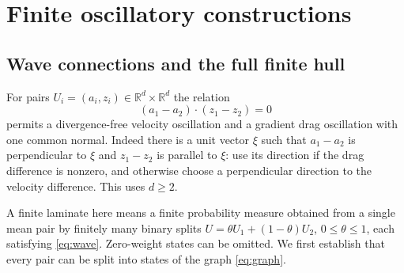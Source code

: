 \documentclass[11pt]{article}
\theoremstyle{remark}
\newcommand{\R}{\mathbb R}
\begin{document}
\section{Finite oscillatory constructions}\label{sec:oscillations}

\subsection{Wave connections and the full finite hull}
For pairs $U_i=(a_i,z_i)\in\R^d\times\R^d$ the relation
\begin{equation}\label{eq:wave}
 (a_1-a_2)\cdot(z_1-z_2)=0
\end{equation}
permits a divergence-free velocity oscillation and a gradient drag
oscillation with one common normal. Indeed there is a unit vector
$\xi$ such that $a_1-a_2$ is perpendicular to $\xi$ and
$z_1-z_2$ is parallel to $\xi$: use its direction if the drag
difference is nonzero, and otherwise choose a perpendicular direction
to the velocity difference. This uses $d\ge2$.

A finite laminate here means a finite probability measure obtained from
a single mean pair by finitely many binary splits
$U=\theta U_1+(1-\theta)U_2$, $0\le\theta\le1$, each satisfying
\eqref{eq:wave}. Zero-weight states can be omitted. We first establish
that every pair can be split into states of the graph \eqref{eq:graph}.
\end{document}
